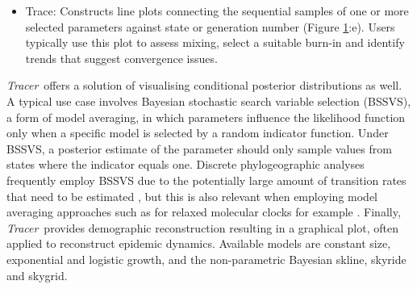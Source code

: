 \documentclass{bioinfo_tracer}
\newcommand{\tracer}{\emph{Tracer}}
\begin{document}
\begin{itemize}
\begin{figure}[t]
\caption{Overview of \tracer\ functionality and individual parameter visualisations: (a) Main \tracer\ panel upon loading a single trace file; (b) boxplot representation of two continuous parameters; (c) kernel density estimates; (d) violin plots; (e) the actual traces connecting the parameter values visited by the Markov chain.}
\label{fig:overview}
\end{figure}
%
\item Trace: Constructs line plots connecting the sequential samples of one or more selected parameters against state or generation number (Figure \ref{fig:overview}:e).  Users typically use this plot to assess mixing, select a suitable burn-in and identify trends that suggest convergence issues.
\end{itemize}
%

\tracer\ offers a solution of visualising conditional posterior distributions as well.
A typical use case involves Bayesian stochastic search variable selection (BSSVS), a form of model averaging, in which parameters influence the likelihood function only when a specific model is selected by a random indicator function.
Under BSSVS, a posterior estimate of the parameter should only sample values from states where the indicator equals one.
Discrete phylogeographic analyses frequently employ BSSVS due to the potentially large amount of transition rates that need to be estimated \citep{Lemey2009}, but this is also relevant when employing model averaging approaches such as for relaxed molecular clocks for example \citep{Li2012}.
%
Finally, \tracer\ provides demographic reconstruction resulting in a graphical plot, often applied to reconstruct epidemic dynamics.
Available models are constant size, exponential and logistic growth,
and the non-parametric Bayesian skline, skyride and skygrid.
\end{document}
